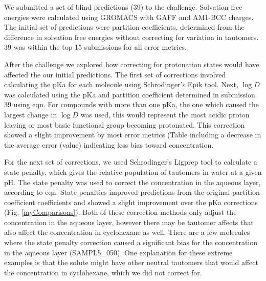 We submitted a set of blind predictions (39) to the challenge. 
Solvation free energies were calculated using GROMACS with GAFF and AM1-BCC charges. 
The initial set of predictions were partition coefficients, determined from the difference in solvation free energies without correcting for variation in tautomers. 
39 was within the top 15 %
submissions for all error metrics.  

After the challenge we explored how correcting for protonation states would have affected the our initial predictions. 
The first set of corrections involved calculating the pKa for each molecule using Schrodinger's Epik tool. 
Next, $\log D$ was calculated using the pKa and partition coefficient determined in submission 39 using eqn. %
For compounds with more than one pKa, the one which caused the largest change in $\log D$ was used, this would represent the most acidic proton leaving or most basic functional group becoming protonated. %
This correction showed a slight improvement by most error metrics (Table %
including a decrease in the average error (value) indicating less bias toward concentration. 

For the next set of corrections, we used Schrodinger's Ligprep tool to calculate a state penalty, which gives the relative population of tautomers in water at a given pH. %
The state penalty was used to correct the concentration in the aqueous layer, according to eqn. %
State penalties improved predictions from the original partition coefficient coefficients and showed a slight improvement over the pKa corrections (Fig. \ref{myComparisons}). 
Both of these correction methods only adjust the concentration in the aqueous layer, however there may be tautomer affects that also affect the concentration in cyclohexane as well. 
There are a few molecules where the state penalty correction caused a significant bias for the concentration in the aqueous layer (SAMPL5\_050). %
One explanation for these extreme examples is that the solute might have other neutral tautomers that would affect the concentration in cyclohexane, which we did not correct for. 


